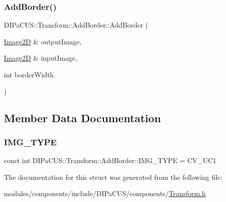 \subsubsection{\texorpdfstring{Add\+Border()}{AddBorder()}}
{\footnotesize\ttfamily D\+I\+Pa\+C\+U\+S\+::\+Transform\+::\+Add\+Border\+::\+Add\+Border (\begin{DoxyParamCaption}\item[{\mbox{\hyperlink{structDIPaCUS_1_1Transform_1_1AddBorder_afc1095eded4646df5be042cfe0a9c20a}{Image2D}} \&}]{output\+Image,  }\item[{\mbox{\hyperlink{structDIPaCUS_1_1Transform_1_1AddBorder_afc1095eded4646df5be042cfe0a9c20a}{Image2D}} \&}]{input\+Image,  }\item[{int}]{border\+Width }\end{DoxyParamCaption})}



\subsection{Member Data Documentation}
\mbox{\label{structDIPaCUS_1_1Transform_1_1AddBorder_a90d789c0649b9c0e299b7ebf374c5c57}} 
\subsubsection{\texorpdfstring{I\+M\+G\+\_\+\+T\+Y\+PE}{IMG\_TYPE}}
{\footnotesize\ttfamily const int D\+I\+Pa\+C\+U\+S\+::\+Transform\+::\+Add\+Border\+::\+I\+M\+G\+\_\+\+T\+Y\+PE = C\+V\+\_\+U\+C1}



The documentation for this struct was generated from the following file\+:\begin{DoxyCompactItemize}
\item 
modules/components/include/\+D\+I\+Pa\+C\+U\+S/components/\mbox{\hyperlink{Transform_8h}{Transform.\+h}}\end{DoxyCompactItemize}

